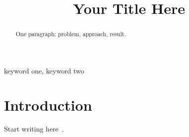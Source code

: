 \documentclass[conference]{IEEEtran}
\title{Your Title Here}
\author{\IEEEauthorblockN{First Author}
\IEEEauthorblockA{Institution \\ City, Country \\ email@example.org}}
\begin{document}
\maketitle

\begin{abstract}
One paragraph: problem, approach, result. %
\end{abstract}

\begin{IEEEkeywords}
keyword one, keyword two
\end{IEEEkeywords}

\section{Introduction}
Start writing here~\cite{example2024}. %



\end{document}
